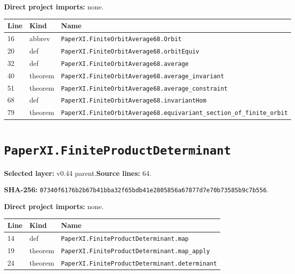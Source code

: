 \documentclass[10pt,oneside]{book}
\begin{document}

\textbf{Direct project imports:} none.

\begin{longtable}{@{}p{}p{}p{}@{}}\toprule Line&Kind&Name\\\midrule\endhead

16&abbrev&\nolinkurl{PaperXI.FiniteOrbitAverage68.Orbit}\\

20&def&\nolinkurl{PaperXI.FiniteOrbitAverage68.orbitEquiv}\\

32&def&\nolinkurl{PaperXI.FiniteOrbitAverage68.average}\\

40&theorem&\nolinkurl{PaperXI.FiniteOrbitAverage68.average_invariant}\\

51&theorem&\nolinkurl{PaperXI.FiniteOrbitAverage68.average_constraint}\\

68&def&\nolinkurl{PaperXI.FiniteOrbitAverage68.invariantHom}\\

79&theorem&\nolinkurl{PaperXI.FiniteOrbitAverage68.equivariant_section_of_finite_orbit}\\

\bottomrule\end{longtable}

\section{\texorpdfstring{\nolinkurl{PaperXI.FiniteProductDeterminant}}{PaperXI.FiniteProductDeterminant}}\label{module:PaperXI.FiniteProductDeterminant}

\textbf{Selected layer:} v0.44 parent.\quad\textbf{Source lines:} 64.\par\textbf{SHA-256:} {\scriptsize\nolinkurl{07340f6176b2b67b41bba32f65bdb41e2805856a67877d7e70b73585b9c7b556}}.


\textbf{Direct project imports:} none.

\begin{longtable}{@{}p{}p{}p{}@{}}\toprule Line&Kind&Name\\\midrule\endhead

14&def&\nolinkurl{PaperXI.FiniteProductDeterminant.map}\\

19&theorem&\nolinkurl{PaperXI.FiniteProductDeterminant.map_apply}\\

24&theorem&\nolinkurl{PaperXI.FiniteProductDeterminant.determinant}\\

\bottomrule\end{longtable}
\end{document}
